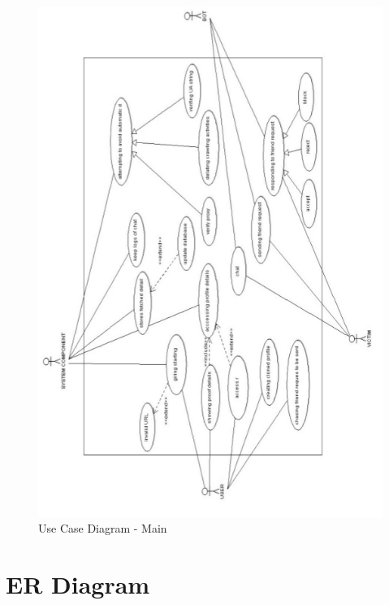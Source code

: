 \begin{figure}[H]
\centering
\includegraphics[scale=1.0]{project/diagrams/usecase3}
\caption{Use Case Diagram - Main}
\label{fig:usecase3}
\end{figure}




\section{ER Diagram}


